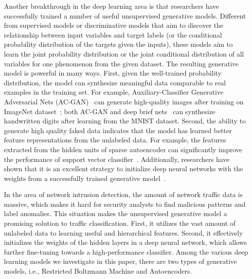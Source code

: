 Another breakthrough in the deep learning area is that researchers have successfully trained a number of useful unsupervised generative models.
Different from supervised models or discriminative models that aim to discover the relationship between input variables and target labels (or the conditional probability distribution of the targets given the inputs),
these models aim to learn the joint probability distribution or the joint conditional distribution of all variables for one phenomenon from the given dataset.
The resulting generative model is powerful in many ways.
First, given the well-trained probability distribution, the model can synthesize meaningful data comparable to real examples in the training set.
For example, Auxiliary-Classifier Generative Adversarial Nets (AC-GAN)~\cite{AC-GAN} can generate high-quality images after training on ImageNet dataset~\cite{ImageNet};
both AC-GAN and deep brief nets~\cite{DeepBeliefNets} can synthesize handwritten digits after learning from the MNIST dataset.
Second, the ability to generate high quality faked data indicates that
the model has learned better feature representations from the unlabeled data.
For example, the features extracted from the hidden units of sparse autoencoder can significantly improve the performance of support vector classifier~\cite{SparseAE}.
Additionally, researchers have shown that it is an excellent strategy to initialize deep neural networks with the weights from a successfully trained generative model~\cite{DeepBeliefNets, Momentum}.

In the area of network intrusion detection, the amount of network traffic data is massive,
which makes it hard for security analysts to find malicious patterns and label anomalies.
This situation makes the unsupervised generative model a promising solution
to traffic classification. %
First, it utilizes the vast amount of unlabeled data to learning useful and hierarchical features. Second, it effectively initializes the weights of the hidden layers in a deep neural network, which allows further fine-tuning towards a high-performance classifier.
Among the various deep learning models we investigate in this paper, there are two types of generative models, i.e., Restricted Boltzmann Machine and Autoencoders. %


